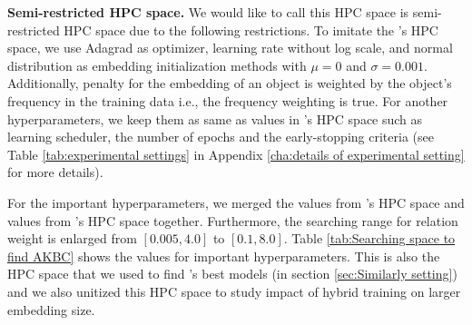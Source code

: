 \noindent\textbf{Semi-restricted HPC space.} We would like to call this HPC space is semi-restricted HPC space due to the following restrictions. To imitate the \cite{chen2021relation}'s HPC space, we use Adagrad as optimizer, learning rate without log scale, and normal distribution as embedding initialization methods with $\mu=0$ and $\sigma=0.001$. Additionally, penalty for the embedding of an object is weighted by the object's frequency in the training data i.e., the frequency weighting is true. For another hyperparameters, we keep them as same as values in \citet{Ruffinelli2020You}'s HPC space such as learning scheduler, the number of epochs and the early-stopping criteria (see Table \ref{tab:experimental settings} in Appendix \ref{cha:details of experimental setting} for more details).  

For the important hyperparameters, we merged the values from \citet{Ruffinelli2020You}'s HPC space and values from \cite{chen2021relation}'s HPC space together. Furthermore, the searching range for relation weight is enlarged from $[0.005, 4.0]$ to $[0.1, 8.0]$. Table \ref{tab:Searching space to find AKBC} shows the values for important hyperparameters. This is also the HPC space that we used to find \citet{chen2021relation}'s best models (in section \ref{sec:Similarly setting}) and we also unitized this HPC space to study impact of hybrid training on larger embedding size.


